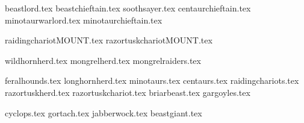 
{beastlord.tex}
{beastchieftain.tex}
{soothsayer.tex}
{centaurchieftain.tex}
{minotaurwarlord.tex}
{minotaurchieftain.tex}

\clearpage
{}
{raidingchariotMOUNT.tex}
{razortuskchariotMOUNT.tex}

\clearpage
{}
{wildhornherd.tex}
{mongrelherd.tex}
{mongrelraiders.tex}

\clearpage
{}
{feralhounds.tex}
{longhornherd.tex}
{minotaurs.tex}
{centaurs.tex}
{raidingchariots.tex}
{razortuskherd.tex}
{razortuskchariot.tex}
{briarbeast.tex}
{gargoyles.tex}

\clearpage
{}
{cyclops.tex}
{gortach.tex}
{jabberwock.tex}
{beastgiant.tex}
